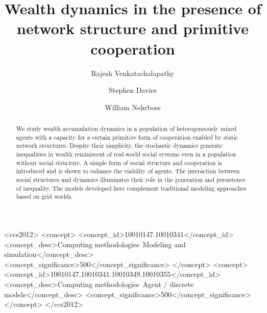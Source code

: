 \documentclass[sigconf]{acmart}
\begin{document}
\title[Wealth dynamics in the presence of network structure and primitive cooperation]{Wealth dynamics in the presence of\\network structure and primitive cooperation}

\author{Rajesh Venkatachalapathy}

\author{Stephen Davies}

\author{William Nehrboss}




\begin{abstract}
We study wealth accumulation dynamics in a population of heterogeneously mixed agents with a capacity for a certain primitive form of cooperation enabled by static network structures. Despite their simplicity, the stochastic dynamics generate inequalities in wealth reminiscent of real-world social systems even in a population without social structure. A simple form of social structure and cooperation is introduced and is shown to enhance the viability of agents. The interaction between social structures and dynamics illuminates their role in the generation and persistence of inequality. The models developed here complement traditional modeling approaches based on grid worlds.   

\end{abstract}

%
%
\begin{CCSXML}
<ccs2012>
<concept>
<concept_id>10010147.10010341</concept_id>
<concept_desc>Computing methodologies~Modeling and simulation</concept_desc>
<concept_significance>500</concept_significance>
</concept>
<concept>
<concept_id>10010147.10010341.10010349.10010355</concept_id>
<concept_desc>Computing methodologies~Agent / discrete models</concept_desc>
<concept_significance>500</concept_significance>
</concept>
</ccs2012>
\end{CCSXML}
\end{document}
